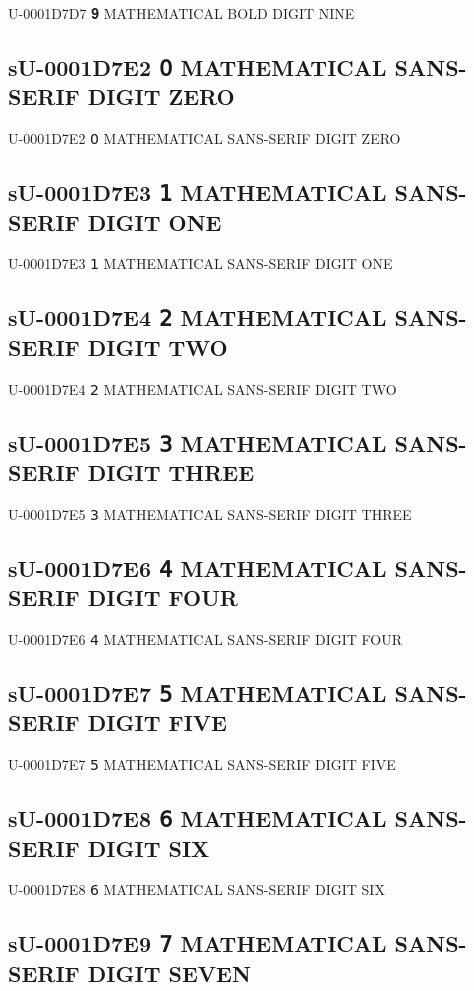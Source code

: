 U-0001D7D7 𝟗 MATHEMATICAL BOLD DIGIT NINE

\subsection{sU-0001D7E2 𝟢 MATHEMATICAL SANS-SERIF DIGIT ZERO}

U-0001D7E2 𝟢 MATHEMATICAL SANS-SERIF DIGIT ZERO

\subsection{sU-0001D7E3 𝟣 MATHEMATICAL SANS-SERIF DIGIT ONE}

U-0001D7E3 𝟣 MATHEMATICAL SANS-SERIF DIGIT ONE

\subsection{sU-0001D7E4 𝟤 MATHEMATICAL SANS-SERIF DIGIT TWO}

U-0001D7E4 𝟤 MATHEMATICAL SANS-SERIF DIGIT TWO

\subsection{sU-0001D7E5 𝟥 MATHEMATICAL SANS-SERIF DIGIT THREE}

U-0001D7E5 𝟥 MATHEMATICAL SANS-SERIF DIGIT THREE

\subsection{sU-0001D7E6 𝟦 MATHEMATICAL SANS-SERIF DIGIT FOUR}

U-0001D7E6 𝟦 MATHEMATICAL SANS-SERIF DIGIT FOUR

\subsection{sU-0001D7E7 𝟧 MATHEMATICAL SANS-SERIF DIGIT FIVE}

U-0001D7E7 𝟧 MATHEMATICAL SANS-SERIF DIGIT FIVE

\subsection{sU-0001D7E8 𝟨 MATHEMATICAL SANS-SERIF DIGIT SIX}

U-0001D7E8 𝟨 MATHEMATICAL SANS-SERIF DIGIT SIX

\subsection{sU-0001D7E9 𝟩 MATHEMATICAL SANS-SERIF DIGIT SEVEN}

